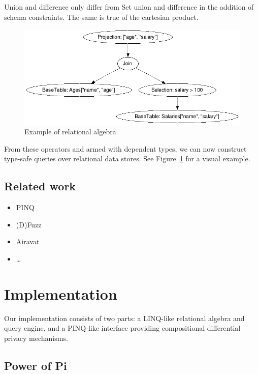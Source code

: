 \documentclass[12pt]{article}
\begin{document}
Union and difference only differ from Set union and difference in the addition of schema constraints.
The same is true of the cartesian product.

\begin{figure}[tb]
  \centering
  \includegraphics[width=\textwidth]{assets/relalg.jpg}
  \caption{Example of relational algebra}
  \label{fig:example_relalg}
\end{figure}

From these operators and armed with dependent types, we can now construct type-safe queries over relational data stores.
See Figure~\ref{fig:example_relalg} for a visual example.

\subsection{Related work}\label{sec:related_work}

\begin{itemize}
  \item PINQ
  \item (D)Fuzz
  \item Airavat
  \item \ldots
\end{itemize}

\section{Implementation}\label{sec:implementation}

Our implementation consists of two parts: a LINQ-like relational algebra and query engine, and a PINQ-like interface providing compositional differential privacy mechanisms.

\subsection{Power of Pi}\label{sec:power_of_pi}
\end{document}
